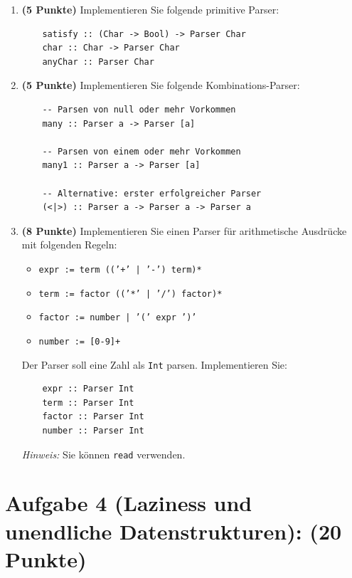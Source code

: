 \documentclass[12pt,a4paper]{article}
\makeatletter
\def\cleardoublepage{\clearpage\if@twoside\ifodd\c@page\else%
\hbox{}%
\thispagestyle{empty}%
\newpage%
\if@twocolumn\hbox{}\newpage\fi\fi\fi}
\makeatother
\begin{document}
\begin{enumerate}
    \item \textbf{(5 Punkte)} Implementieren Sie folgende primitive Parser:
    \begin{verbatim}
    satisfy :: (Char -> Bool) -> Parser Char
    char :: Char -> Parser Char
    anyChar :: Parser Char
    \end{verbatim}
    
    \item \textbf{(5 Punkte)} Implementieren Sie folgende Kombinations-Parser:
    \begin{verbatim}
    -- Parsen von null oder mehr Vorkommen
    many :: Parser a -> Parser [a]
    
    -- Parsen von einem oder mehr Vorkommen
    many1 :: Parser a -> Parser [a]
    
    -- Alternative: erster erfolgreicher Parser
    (<|>) :: Parser a -> Parser a -> Parser a
    \end{verbatim}
    
    \item \textbf{(8 Punkte)} Implementieren Sie einen Parser für arithmetische Ausdrücke mit folgenden Regeln:
    \begin{itemize}
        \item \texttt{expr := term (('+' | '-') term)*}
        \item \texttt{term := factor (('*' | '/') factor)*}
        \item \texttt{factor := number | '(' expr ')'}
        \item \texttt{number := [0-9]+}
    \end{itemize}
    
    Der Parser soll eine Zahl als \texttt{Int} parsen. Implementieren Sie:
    \begin{verbatim}
    expr :: Parser Int
    term :: Parser Int
    factor :: Parser Int
    number :: Parser Int
    \end{verbatim}
    
    \textit{Hinweis:} Sie können \texttt{read} verwenden.
\end{enumerate}

\cleardoublepage

\section*{Aufgabe 4 (Laziness und unendliche Datenstrukturen): (20 Punkte)}
\end{document}
